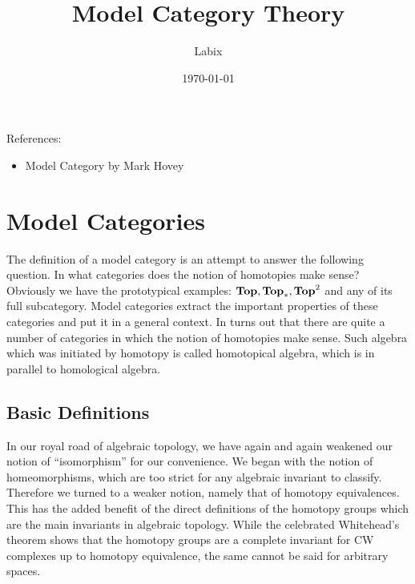 \documentclass[a4paper]{article}
\title{Model Category Theory}
\author{Labix}
\date{\today}
\begin{document}
\maketitle
\begin{abstract}

\end{abstract}
References: 
\begin{itemize}
\item Model Category by Mark Hovey
\end{itemize}
\pagebreak
\tableofcontents

\pagebreak
\section{Model Categories}
The definition of a model category is an attempt to answer the following question. In what categories does the notion of homotopies make sense? Obviously we have the prototypical examples: $\bold{Top}, \bold{Top}_\ast, \bold{Top}^2$ and any of its full subcategory. Model categories extract the important properties of these categories and put it in a general context. In turns out that there are quite a number of categories in which the notion of homotopies make sense. Such algebra which was initiated by homotopy is called homotopical algebra, which is in parallel to homological algebra. 

\subsection{Basic Definitions}
In our royal road of algebraic topology, we have again and again weakened our notion of ``isomorphism'' for our convenience. We began with the notion of homeomorphisms, which are too strict for any algebraic invariant to classify. Therefore we turned to a weaker notion, namely that of homotopy equivalences. This has the added benefit of the direct definitions of the homotopy groups which are the main invariants in algebraic topology. While the celebrated Whitehead's theorem shows that the homotopy groups are a complete invariant for CW complexes up to homotopy equivalence, the same cannot be said for arbitrary spaces. \\~\\
\end{document}

